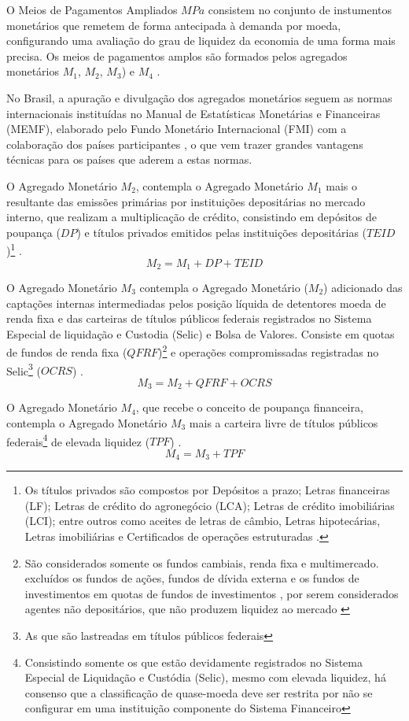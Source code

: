 \documentclass[12pt,12pt,openright,oneside,a4paper,chapter=TITLE,section=TITLE,subsection=TITLE,subsubsection=TITLE,english,french,spanish,portugues,sumario=tradicional]{abntex2}
\begin{document}
O Meios de Pagamentos Ampliados \(MPa\) consistem no conjunto de instumentos monetários que remetem de forma antecipada à demanda por moeda, configurando uma avaliação do grau de liquidez da economia de uma forma mais precisa. Os meios de pagamentos amplos são formados pelos agregados monetários \(M_1\), \(M_2\), \(M_3\)) e \(M_4\) \cite{sgs:mpa}.

No Brasil, a apuração e divulgação dos agregados monetários seguem as normas internacionais instituídas no Manual de Estatísticas Monetárias e Financeiras (MEMF), elaborado pelo Fundo Monetário Internacional (FMI) com a colaboração dos países participantes \cite{sgs:mpa}, o que vem trazer grandes vantagens técnicas para os países que aderem a estas normas.

O Agregado Monetário \(M_2\), contempla o Agregado Monetário \(M_1\) mais o resultante das emissões primárias por instituições depositárias no mercado interno, que realizam a multiplicação de crédito, consistindo em depósitos de poupança (\(DP\)) e títulos privados emitidos pelas instituições depositárias (\(TEID\))\footnote{Os títulos privados são compostos por Depósitos a prazo; Letras financeiras (LF); Letras de crédito do agronegócio (LCA); Letras de crédito imobiliárias (LCI); entre outros como aceites de letras de câmbio, Letras hipotecárias, Letras imobiliárias e Certificados de operações estruturadas \cite{sgs:mpa}.} \cite{sgs:mpa}.
\[
M_2 = M_1 + DP + TEID
\]

O Agregado Monetário \(M_3\) contempla o Agregado Monetário (\(M_2\)) adicionado das captações internas intermediadas pelos posição líquida de detentores moeda de renda fixa e das carteiras de títulos públicos federais registrados no Sistema Especial de liquidação e Custodia (Selic) e Bolsa de Valores. Consiste em quotas de fundos de renda fixa (\(QFRF\))\footnote{São considerados somente os fundos cambiais, renda fixa  e multimercado. excluídos os fundos de ações, fundos de dívida externa e os fundos de investimentos em quotas de fundos de investimentos , por serem considerados agentes não depositários, que não produzem liquidez ao mercado \cite{sgs:mpa}} e operações compromissadas registradas no Selic\footnote{As que são lastreadas em títulos públicos federais} (\(OCRS\)) \cite{bcb:2019} \cite{sgs:mpa}.
\[
M_3 = M_2 + QFRF + OCRS
\]

O Agregado Monetário \(M_4\), que recebe o conceito de poupança financeira, contempla o Agregado Monetário \(M_3\) mais a carteira livre de títulos públicos federais\footnote{Consistindo somente os que estão devidamente registrados no Sistema Especial de Liquidação e Custódia (Selic), mesmo com elevada liquidez, há consenso que a classificação de quase-moeda deve ser restrita por não se configurar em uma instituição componente do Sistema Financeiro} de elevada liquidez (\(TPF\)) \cite{bcb:2019}.
\[
M_4 = M_3 + TPF
\]
\end{document}
